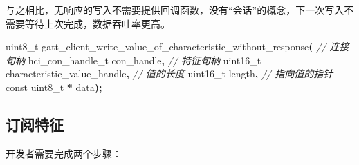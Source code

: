 \documentclass[
  12pt,
]{book}
\newenvironment{Shaded}{\begin{snugshade}}{\end{snugshade}}
\newcommand{\CommentTok}[1]{\textcolor[rgb]{0.56,0.35,0.01}{\textit{#1}}}
\newcommand{\DataTypeTok}[1]{\textcolor[rgb]{0.13,0.29,0.53}{#1}}
\newcommand{\NormalTok}[1]{#1}
\newcommand{\OperatorTok}[1]{\textcolor[rgb]{0.81,0.36,0.00}{\textbf{#1}}}
\begin{document}
与之相比，无响应的写入不需要提供回调函数，没有``会话''的概念，下一次写入不需要等待上次完成，数据吞吐率更高。

\begin{Shaded}
\begin{Highlighting}[]
\DataTypeTok{uint8\_t}\NormalTok{ gatt\_client\_write\_value\_of\_characteristic\_without\_response}\OperatorTok{(}
    \CommentTok{// 连接句柄}
\NormalTok{    hci\_con\_handle\_t con\_handle}\OperatorTok{,}
    \CommentTok{// 特征句柄}
    \DataTypeTok{uint16\_t}\NormalTok{ characteristic\_value\_handle}\OperatorTok{,}
    \CommentTok{// 值的长度}
    \DataTypeTok{uint16\_t}\NormalTok{ length}\OperatorTok{,}
    \CommentTok{// 指向值的指针}
    \DataTypeTok{const} \DataTypeTok{uint8\_t} \OperatorTok{*}\NormalTok{ data}\OperatorTok{);}
\end{Highlighting}
\end{Shaded}

\hypertarget{ux8ba2ux9605ux7279ux5f81}{%
\subsection{订阅特征}\label{ux8ba2ux9605ux7279ux5f81}}

开发者需要完成两个步骤：
\end{document}
